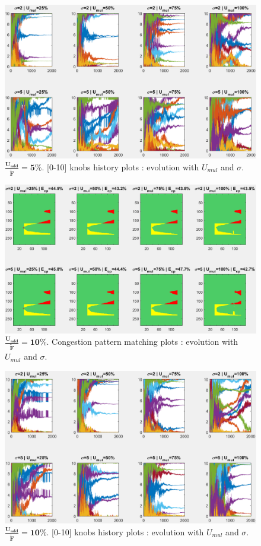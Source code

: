 \begin{figure}[!h]
	\centering
	\caption{$\mathbf{\frac{U_{add}}{\widetilde{F}}=5\%}$. [0-10] knobs history plots : evolution with $U_{mul}$ and $\sigma$.}
	\label{fig:uaddknobs5}
	\includegraphics[width=7in]{figures/results_figures/Uadd/knobs_Uadd_5_lambda_11.png}
\end{figure}
\begin{figure}[!h]
	\centering
	\caption{$\mathbf{\frac{U_{add}}{\widetilde{F}}=10\%}$. Congestion pattern matching plots : evolution with $U_{mul}$ and $\sigma$.}
	\label{fig:uaddcp10}
	\includegraphics[width=7in]{figures/results_figures/Uadd/cp_Uadd_10_lambda_11.png}
\end{figure}	
\begin{figure}[!h]
	\centering
	\caption{$\mathbf{\frac{U_{add}}{\widetilde{F}}=10\%}$. [0-10] knobs history plots : evolution with $U_{mul}$ and $\sigma$.}
	\label{fig:uaddknobs10}
	\includegraphics[width=7in]{figures/results_figures/Uadd/knobs_Uadd_10_lambda_11.png}
\end{figure}
